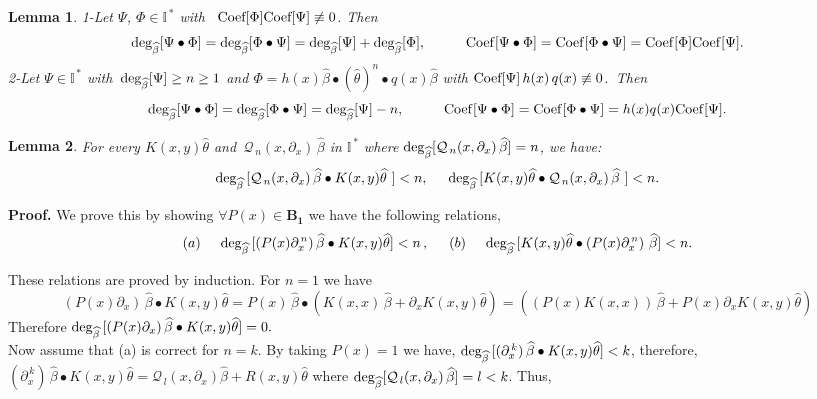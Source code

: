 \documentclass[10pt]{article}
\newcommand{\be}{\begin{equation}}
\newcommand{\ee}{\end{equation}}
\newcommand{\nn}{\nonumber}
\newcommand{\rd}{\partial}
\newcommand{\mIs}{{{\mathbb I}}^{\,*}}
\newcommand{\Deg}{\rm deg_{\widehat{\beta}}}
\newtheorem{lem}{Lemma}
\begin{document}
{{\begin{lem}\label{salar2}{1-Let $\Psi$, $\Phi\in\mIs$ with
\, ${\rm Coef[\Phi]}{\rm Coef[\Psi]}\not\equiv 0$. Then \be
{\Deg}[\Psi\bullet\Phi]= {\rm
deg_{\widehat{\beta}}}[\Phi\bullet\Psi]= {\rm
deg_{\widehat{\beta}}}[\Psi]+{\Deg}[\Phi], \hspace{1cm} {\rm
Coef}[\Psi\bullet\Phi]=
 {\rm Coef}[\Phi\bullet\Psi]=  {\rm Coef}[\Phi] {\rm Coef}[\Psi].\nn\ee 2-Let
 $\Psi\in\mIs$ with
\,${\Deg}[\Psi]\geq n\geq 1$ and $\Phi=h(x){\widehat{\beta}}\bullet
(\widehat{\theta})^n\bullet q(x){\widehat{\beta}}$ with ${\rm
Coef[\Psi]}\, h(x)\, q(x) \not\equiv 0$.\, Then \be {\rm
deg_{\widehat{\beta}}}[\Psi\bullet\Phi]= {\rm
deg_{\widehat{\beta}}}[\Phi\bullet\Psi]= {\rm
deg_{\widehat{\beta}}}[\Psi]-n, \hspace{1cm} {\rm
Coef}[\Psi\bullet\Phi]=
 {\rm Coef}[\Phi\bullet\Psi]=  h(x) q(x) {\rm Coef}[\Psi].\nn\ee}
\end{lem}


\begin{lem}\label{mahmood}{For every $K(x,y)\widehat{\theta}$ and
\,${\mathcal{Q}_{\,n}}(x,\rd_{x})\,\widehat{\beta}$ in $\mIs$ where
${\rm
deg_{\widehat{\beta}}}[{\mathcal{Q}_{\,n}}(x,\rd_{x})\,\widehat{\beta}]=n$,
we have: \be {\rm
deg_{\widehat{\beta}}}\,[{\mathcal{Q}_{\,n}}(x,\rd_{x})\,\widehat{\beta}\bullet
K(x,y)\widehat{\theta}\,\,]< n, \hspace{0.5cm} {\rm
deg_{\widehat{\beta}}}\,[
K(x,y)\widehat{\theta}\bullet{\mathcal{Q}_{\,n}}(x,\rd_{x})\,\widehat{\beta}\,\,]<
n. \label{rahamin1}\nn \ee}
\end{lem}
{\bf Proof.}  We prove this by showing $\forall P(x)\in \boldsymbol
{B_{1}}$ we have the following relations, \be (a)\hspace{0.5cm} {\rm
deg_{\widehat{\beta}}}\,[(P(x)\rd^{\,n}_{x})\,\widehat{\beta}\bullet
K(x,y)\widehat{\theta}]< n\,, \hspace{0.5cm}(b)\hspace{0.5cm} {\rm
deg_{\widehat{\beta}}}\,[ K(x,y)\widehat{\theta}\bullet
(P(x)\rd^{\,n}_{x})\,\,\widehat{\beta}]< n. \label{raha1}\nn\ee

These relations are proved by induction. For $n=1$ we have
\be(P(x)\rd_{x})\,\widehat{\beta}\bullet
K(x,y)\widehat{\theta}=P(x)\,\widehat{\beta}\bullet(K(x,x)\,\widehat{\beta}+\rd_{x}
K(x,y)\widehat{\theta})=((P(x)K(x,x))\,\widehat{\beta}+P(x)\rd_{x}
K(x,y)\widehat{\theta})\nn\ee Therefore $ {\rm
deg_{\widehat{\beta}}}\,[(P(x)\rd_{x})\,\widehat{\beta}\bullet
K(x,y)\widehat{\theta}]= 0. $\\
Now assume that (a) is correct for $n=k$. By taking $P(x)=1$ we
have, ${\rm
deg_{\widehat{\beta}}}\,[(\rd^{\,k}_{x})\,\widehat{\beta}\bullet
K(x,y)\widehat{\theta}]< k$, therefore,
$(\rd^{\,k}_{x})\,\widehat{\beta}\bullet
K(x,y)\widehat{\theta}={\mathcal{Q}_{\,l}}(x,\rd_{x})\widehat{\beta}+R(x,y)\widehat{\theta}$
where ${\rm
deg_{\widehat{\beta}}}[{\mathcal{Q}_{\,l}}(x,\rd_{x})\,\widehat{\beta}]=l<k$.
Thus,

}}
\end{document}
